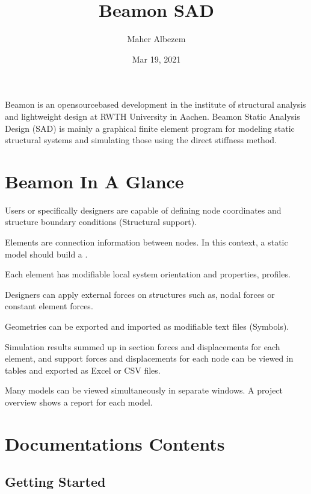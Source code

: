 \documentclass[letterpaper,10pt,english]{sphinxmanual}
\title{Beamon SAD}
\date{Mar 19, 2021}
\author{Maher Albezem}
\begin{document}
\pagestyle{empty}
\sphinxmaketitle
\pagestyle{plain}
\sphinxtableofcontents
\pagestyle{normal}
\label{\detokenize{index::doc}}


Beamon is an open\sphinxhyphen{}source\sphinxhyphen{}based development in the institute of structural analysis and
lightweight design at RWTH University in Aachen. Beamon Static Analysis Design (SAD) is mainly
a graphical finite element program for modeling static structural systems and simulating those using
the direct stiffness method.

\noindent{}


\chapter{Beamon In A Glance}
\label{\detokenize{index:beamon-in-a-glance}}
\noindent{}

Users or specifically designers are capable of defining node coordinates and structure boundary conditions (Structural support).

Elements are connection information between nodes. In this context, a static model should build a
.

Each element has modifiable local system orientation and properties, profiles.

Designers can apply external forces on structures such as, nodal forces or constant element forces.

Geometries can be exported and imported as modifiable text files
(\sphinxhyphen{}Symbols).

Simulation results summed up in section forces and displacements for each element, and support forces and displacements
for each node can be viewed in tables and exported as Excel or CSV files.

Many models can be viewed simultaneously in separate windows. A project overview shows a report for each model.


\chapter{Documentations Contents}
\label{\detokenize{index:documentations-contents}}

\section{Getting Started}
\label{\detokenize{getting_started:getting-started}}\label{\detokenize{getting_started::doc}}
\end{document}
